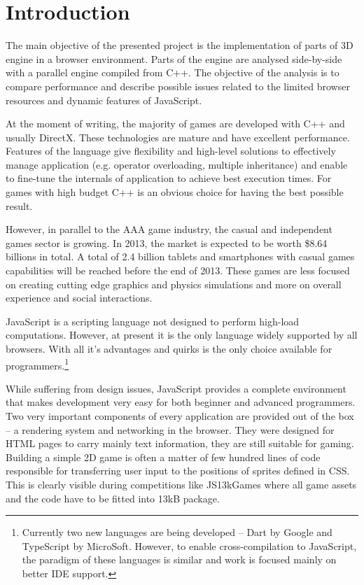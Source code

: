 \chapter{Introduction}
\label{cha:introduction}

The main objective of the presented project is the implementation of parts of 3D engine in a browser environment. Parts of the engine are analysed side-by-side with a parallel engine compiled from C++. The objective of the analysis is to compare performance and describe possible issues related to the limited browser resources and dynamic features of JavaScript.

At the moment of writing, the majority of games are developed with C++ and usually DirectX. These technologies are mature and have excellent performance. Features of the language give flexibility and high-level solutions to effectively manage application (e.g. operator overloading, multiple inheritance) and enable to fine-tune the internals of application to achieve best execution times. For games with high budget\cite{gta} C++ is an obvious choice for having the best possible result.

However, in parallel to the AAA game industry, the casual and independent games sector is growing. In 2013, the market is expected to be worth \$8.64 billions in total. A total of 2.4 billion tablets and smartphones with casual games capabilities will be reached before the end of 2013. These games are less focused on creating cutting edge graphics and physics simulations and more on overall experience and social interactions.

JavaScript is a scripting language not designed to perform high-load computations. However, at present it is the only language widely supported by all browsers. With all it's advantages and quirks is the only choice available for programmers.\footnote{Currently two new languages are being developed -- Dart by Google and TypeScript by MicroSoft. However, to enable cross-compilation to JavaScript, the paradigm of these languages is similar and work is focused mainly on better IDE support.}

While suffering from design issues, JavaScript provides a complete environment that makes development very easy for both beginner and advanced programmers. Two very important components of every application are provided out of the box -- a rendering system and networking in the browser. They were designed for HTML pages to carry mainly text information, they are still suitable for gaming. Building a simple 2D game is often a matter of few hundred lines of code responsible for transferring user input to the positions of sprites defined in CSS. This is clearly visible during competitions like JS13kGames\cite{js13kgames} where all game assets and the code have to be fitted into 13kB package.

